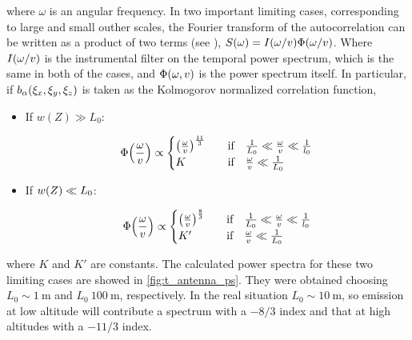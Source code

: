 where $\omega$ is an angular frequency. In two important limiting cases,
corresponding to large and small outher scales, the Fourier transform of
the autocorrelation can be written as a product of two terms (see
\cite{church1995predicting}), $S\qty(\omega) =
I\qty(\omega/v)\Phi\qty(\omega/v)$. Where $I\qty(\omega/v)$ is the
instrumental filter on the temporal power spectrum, which is the same in
both of the cases, and $\Phi\qty(\omega,v)$ is the power spectrum itself.
In particular, if $b_\alpha\qty(\xi_x,\xi_y,\xi_z)$ is taken as the
Kolmogorov normalized correlation function,

\begin{itemize}
        \item If $w(Z) \gg L_0$:

        \begin{equation}
                \Phi\qty(\frac{\omega}{v}) \propto
                        \begin{cases}
                                \qty(\frac{\omega}{v})^{\frac{11}{3}} & \qif
                                \frac{1}{L_0} \ll \frac{\omega}{v}
                                \ll \frac{1}{l_0} \\
                                K & \qif \frac{\omega}{v} \ll \frac{1}{L_0}
                        \end{cases}
        \end{equation}

        \item If $w\qty(Z) \ll L_0$:

        \begin{equation}
                \Phi\qty(\frac{\omega}{v}) \propto
                        \begin{cases}
                                \qty(\frac{\omega}{v})^{\frac{8}{3}} & \qif
                                \frac{1}{L_0} \ll \frac{\omega}{v}
                                \ll \frac{1}{l_0} \\
                                K' & \qif \frac{\omega}{v} \ll \frac{1}{L_0}
                        \end{cases}
        \end{equation}
\end{itemize}

where $K$ and $K'$ are constants. The calculated power spectra for these
two limiting cases are showed in \autoref{fig:t_antenna_ps}. They were
obtained choosing $L_0 \sim \SI{1}{\meter}$ and $L_0 ~ \SI{100}{\meter}$,
respectively. In the real situation $L_0 \sim \SI{10}{\meter}$, so emission
at low altitude will contribute a spectrum with a $-8/3$ index and that at
high altitudes with a $-11/3$ index.


